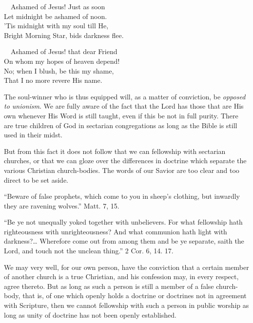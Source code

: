 \documentclass[
]{book}
\begin{document}
~~Ashamed of Jesus! Just as soon\\
\hspace*{0.333em}\hspace*{0.333em}Let midnight be ashamed of noon.\\
\hspace*{0.333em}\hspace*{0.333em}'Tis midnight with my soul till He,\\
\hspace*{0.333em}\hspace*{0.333em}Bright Morning Star, bids darkness flee.

~~Ashamed of Jesus! that dear Friend\\
\hspace*{0.333em}\hspace*{0.333em}On whom my hopes of heaven depend!\\
\hspace*{0.333em}\hspace*{0.333em}No; when I blush, be this my shame,\\
\hspace*{0.333em}\hspace*{0.333em}That I no more revere His name.

The soul-winner who is thus equipped will, as a matter of conviction, be \emph{opposed to unionism}. We are fully aware of the fact that the Lord has those that are His own whenever His Word is still taught, even if this be not in full purity. There are true children of God in sectarian congregations as long as the Bible is still used in their midst.

But from this fact it does not follow that we can fellowship with sectarian churches, or that we can gloze over the differences in doctrine which separate the various Christian church-bodies. The words of our Savior are too clear and too direct to be set aside.

``Beware of false prophets, which come to you in sheep's clothing, but inwardly they are ravening wolves.'' Matt. 7, 15.

``Be ye not unequally yoked together with unbelievers. For what fellowship hath righteousness with unrighteousness? And what communion hath light with darkness?\ldots{} Wherefore come out from among them and be ye separate, saith the Lord, and touch not the unclean thing.'' 2 Cor. 6, 14. 17.

We may very well, for our own person, have the conviction that a certain member of another church is a true Christian, and his confession may, in every respect, agree thereto. But as long as such a person is still a member of a false church-body, that is, of one which openly holds a doctrine or doctrines not in agreement with Scripture, then we cannot fellowship with such a person in public worship as long as unity of doctrine has not been openly established.
\end{document}

